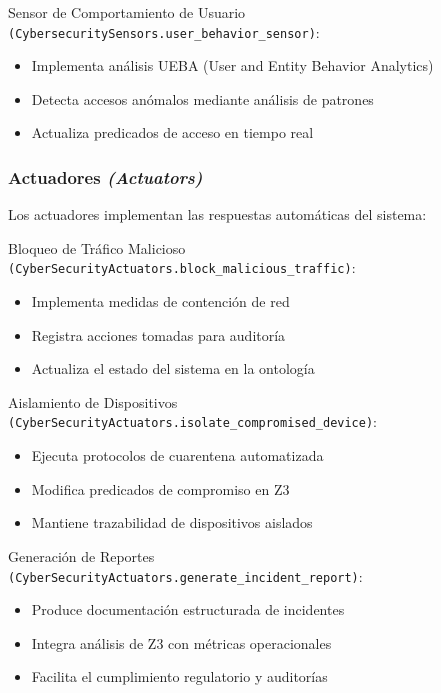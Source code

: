 \noindent Sensor de Comportamiento de Usuario \verb|(CybersecuritySensors.user_behavior_sensor)|:

\begin{itemize}
    \item Implementa análisis UEBA (User and Entity Behavior Analytics)
    \item Detecta accesos anómalos mediante análisis de patrones
    \item Actualiza predicados de acceso en tiempo real
\end{itemize}

\subsubsection{Actuadores \textit{(Actuators)}}

Los actuadores implementan las respuestas automáticas del sistema:

\noindent Bloqueo de Tráfico Malicioso \verb|(CyberSecurityActuators.block_malicious_traffic)|:

\begin{itemize}
    \item Implementa medidas de contención de red
    \item Registra acciones tomadas para auditoría
    \item Actualiza el estado del sistema en la ontología
\end{itemize}

\noindent Aislamiento de Dispositivos \verb|(CyberSecurityActuators.isolate_compromised_device)|:

\begin{itemize}
    \item Ejecuta protocolos de cuarentena automatizada
    \item Modifica predicados de compromiso en Z3
    \item Mantiene trazabilidad de dispositivos aislados 
\end{itemize}

\noindent Generación de Reportes \verb|(CyberSecurityActuators.generate_incident_report)|:

\begin{itemize}
    \item Produce documentación estructurada de incidentes
    \item Integra análisis de Z3 con métricas operacionales
    \item Facilita el cumplimiento regulatorio y auditorías 
\end{itemize}

